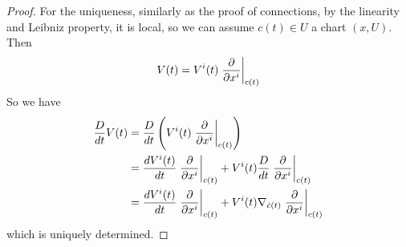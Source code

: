 \begin{proof}
	For the uniqueness, similarly as the proof of connections, by the linearity and Leibniz property, it is local, so we can assume $c(t) \in U$ a chart $(x,U)$. Then
	\begin{equation*}
		V(t) = V^i(t)\left.\frac{\partial}{\partial x^i}\right\lvert_{c(t)}
	\end{equation*}
	So we have
	\begin{equation*}
		\begin{aligned}
			\frac{D}{dt}V(t) &= \frac{D}{dt}\left(V^i(t)\left.\frac{\partial}{\partial x^i}\right\lvert_{c(t)}\right) \\
			&= \frac{dV^i(t)}{dt}\left.\frac{\partial}{\partial x^i}\right\lvert_{c(t)} + V^i(t)\frac{D}{dt}\left.\frac{\partial}{\partial x^i}\right\lvert_{c(t)} \\
			&= \frac{dV^i(t)}{dt}\left.\frac{\partial}{\partial x^i}\right\lvert_{c(t)} + V^i(t)\nabla_{\dot{c}(t)}\left.\frac{\partial}{\partial x^i}\right\lvert_{c(t)} 
		\end{aligned}
	\end{equation*}
	which is uniquely determined.


\end{proof}
